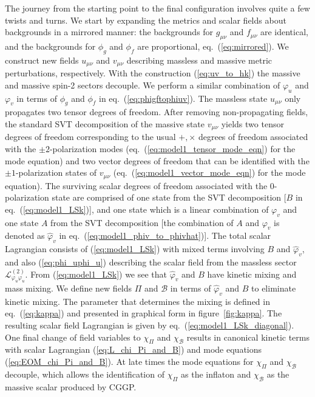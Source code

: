 \documentclass[11pt,a4paper]{article}
\newcommand{\Lcal}{\mathcal{L}}
\newcommand{\fref}[1]{figure~\ref{#1}}
\newcommand{\eref}[1]{eq.~(\ref{#1})}
\begin{document}
The journey from the starting point to the final configuration involves quite a few twists and turns.  We start by expanding the metrics and scalar fields about backgrounds in a mirrored manner: the backgrounds for $g_{\mu\nu}$ and $f_{\mu\nu}$ are identical, and the backgrounds for $\phi_g$ and $\phi_f$ are proportional, \eref{eq:mirrored}.   We construct new fields $u_{\mu\nu}$ and $v_{\mu\nu}$ describing massless and massive metric perturbations, respectively.  With the construction (\ref{eq:uv_to_hk}) the massive and massive spin-2 sectors decouple.  We perform a similar combination of $\varphi_u$ and $\varphi_v$ in terms of $\phi_g$ and $\phi_f$ in \eref{eq:phigftophiuv}.  The massless state $u_{\mu\nu}$ only propagates two tensor degrees of freedom.  After removing non-propagating fields, the standard SVT decomposition of the massive state $v_{\mu\nu}$ yields two tensor degrees of freedom corresponding to the usual $+,\times$ degrees of freedom associated with the $\pm2$-polarization modes (\eref{eq:model1_tensor_mode_eqn} for the mode equation) and two vector degrees of freedom that can be identified with the $\pm1$-polarization states of $v_{\mu\nu}$ (\eref{eq:model1_vector_mode_eqn} for the mode equation). The surviving scalar degrees of freedom associated with the $0$-polarization state are comprised of one state from the SVT decomposition [$B$ in \eref{eq:model1_LSk}], and one state which is a linear combination of $\varphi_v$ and one state $A$ from the SVT decomposition [the combination of $A$ and $\varphi_v$ is denoted as $\hat{\varphi}_v$ in \eref{eq:model1_phiv_to_phivhat}].  The total scalar Lagrangian consists of (\ref{eq:model1_LSk}) with mixed terms involving $B$ and $\hat{\varphi}_v$, and also (\ref{eq:phi_uphi_u}) describing the scalar field from the massless sector $\Lcal^{(2)}_{\varphi_u \varphi_u}$.  From (\ref{eq:model1_LSk}) we see that $\hat{\varphi}_v$ and $B$ have kinetic mixing and mass mixing.  We define new fields $\Pi$ and $\mathcal{B}$ in terms of $\hat{\varphi}_v$ and $B$ to eliminate kinetic mixing.  The parameter that determines the mixing is defined in \eref{eq:kappa} and presented in graphical form in \fref{fig:kappa}.  The resulting scalar field Lagrangian is given by \eref{eq:model1_LSk_diagonal}.  One final change of field variables to $\chi_\Pi$ and $\chi_\mathcal{B}$ results in canonical kinetic terms with scalar Lagrangian (\ref{eq:L_chi_Pi_and_B}) and mode equations (\ref{eq:EOM_chi_Pi_and_B}). At late times the mode equations for $\chi_\Pi$ and $\chi_\mathcal{B}$ decouple, which allows the identification of $\chi_\Pi$ as the inflaton and $\chi_\mathcal{B}$ as the massive scalar produced by CGGP.
\end{document}
